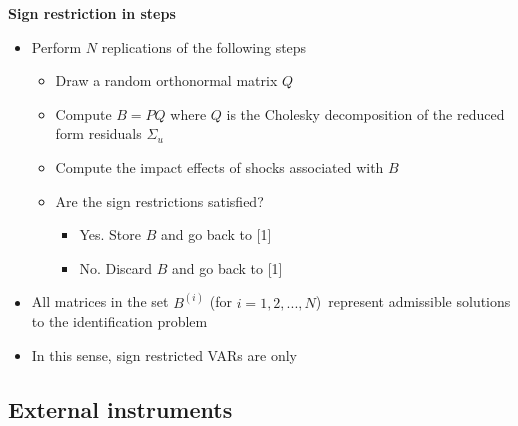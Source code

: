 \documentclass[10pt,english,t,aspectratio=169,ignorenonframetext]{beamer}
\begin{document}

\begin{frame}
{\textbf{Sign restriction in steps}}\smallskip

\begin{itemize}
\item Perform $N$ replications of the following steps\smallskip

\begin{itemize}
\item[{[1]}] Draw a random orthonormal matrix $Q$\medskip

\item[{[2]}] Compute $B=PQ$ where $Q$ is the Cholesky decomposition of the
reduced form residuals $\Sigma _{u}$\medskip

\item[{[3]}] Compute the impact effects of shocks associated with $B$\medskip

\item[{[4]}] Are the sign restrictions satisfied?

\begin{itemize}
\item[{[4.1]}] Yes. Store $B$ and go back to {\footnotesize \color{title}[1]}
\medskip

\item[{[4.2]}] No. Discard $B$ and go back to {\footnotesize \color{title}[1]}%
\bigskip \pause
\end{itemize}
\end{itemize}

\item All matrices in the set $B^{(i)}$ (for $i=1,2,...,N$)\ represent
admissible solutions to the identification problem\bigskip

\item In this sense, sign restricted VARs are only {} 
\end{itemize}
\end{frame}


\subsection{External instruments}
\end{document}
